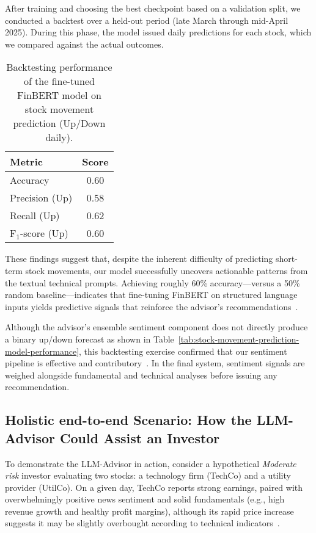 \documentclass[conference]{IEEEtran}
\begin{document}
After training and choosing the best checkpoint based on a validation split, we conducted a backtest over a held-out period (late March through mid-April 2025). During this phase, the model issued daily predictions for each stock, which we compared against the actual outcomes.

\begin{table}[ht]
\centering
\caption{Backtesting performance of the fine-tuned FinBERT model on stock movement prediction (Up/Down daily).}
\label{tab:backtest}
\begin{tabular}{lc}
\hline
\textbf{Metric} & \textbf{Score} \\
\hline
Accuracy & 0.60 \\
Precision (Up) & 0.58 \\
Recall (Up) & 0.62 \\
F$_1$-score (Up) & 0.60 \\
\hline
\end{tabular}
\end{table}
These findings suggest that, despite the inherent difficulty of predicting short-term stock movements, our model successfully uncovers actionable patterns from the textual technical prompts. Achieving roughly 60\% accuracy—versus a 50\% random baseline—indicates that fine-tuning FinBERT on structured language inputs yields predictive signals that reinforce the advisor’s recommendations~\cite{finbert2020}.

Although the advisor’s ensemble sentiment component does not directly produce a binary up/down forecast as shown in Table~\ref{tab:stock-movement-prediction-model-performance}, this backtesting exercise confirmed that our sentiment pipeline is effective and contributory~\cite{deepfinance2021}. In the final system, sentiment signals are weighed alongside fundamental and technical analyses before issuing any recommendation.

\subsection{Holistic end-to-end Scenario: How the LLM-Advisor Could Assist an Investor}

To demonstrate the LLM-Advisor in action, consider a hypothetical \textit{Moderate risk} investor evaluating two stocks: a technology firm (TechCo) and a utility provider (UtilCo). On a given day, TechCo reports strong earnings, paired with overwhelmingly positive news sentiment and solid fundamentals (e.g., high revenue growth and healthy profit margins), although its rapid price increase suggests it may be slightly overbought according to technical indicators~\cite{brown2020}.
\end{document}
